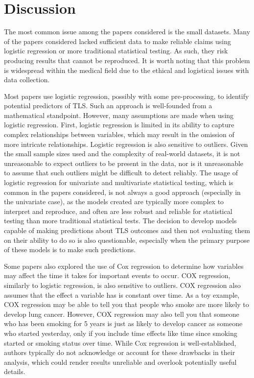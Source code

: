 \documentclass{article}
\begin{document}
\section{Discussion}

The most common issue among the papers considered is the small datasets. Many of the papers considered lacked sufficient data to make reliable claims using logistic regression or more traditional statistical testing. As such, they risk producing results that cannot be reproduced. It is worth noting that this problem is widespread within the medical field due to the ethical and logistical issues with data collection.

Most papers use logistic regression, possibly with some pre-processing, to identify potential predictors of TLS. Such an approach is well-founded from a mathematical standpoint. However, many assumptions are made when using logistic regression. First, logistic regression is limited in its ability to capture complex relationships between variables, which may result in the omission of more intricate relationships. Logistic regression is also sensitive to outliers. Given the small sample sizes used and the complexity of real-world datasets, it is not unreasonable to expect outliers to be present in the data, nor is it unreasonable to assume that such outliers might be difficult to detect reliably. The usage of logistic regression for univariate and multivariate statistical testing, which is common in the papers considered, is not always a good approach (especially in the univariate case), as the models created are typically more complex to interpret and reproduce, and often are less robust and reliable for statistical testing than more traditional statistical tests. The decision to develop models capable of making predictions about TLS outcomes and then not evaluating them on their ability to do so is also questionable, especially when the primary purpose of these models is to make such predictions.

Some papers also explored the use of Cox regression to determine how variables may affect the time it takes for important events to occur. COX regression, similarly to logistic regression, is also sensitive to outliers. COX regression also assumes that the effect a variable has is constant over time. As a toy example, COX regression may be able to tell you that people who smoke are more likely to develop lung cancer. However, COX regression may also tell you that someone who has been smoking for 5 years is just as likely to develop cancer as someone who started yesterday, only if you include time effects like time since smoking started or smoking status over time. While Cox regression is well-established, authors typically do not acknowledge or account for these drawbacks in their analysis, which could render results unreliable and overlook potentially useful details.
\end{document}
